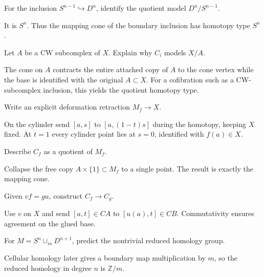 \begin{problem}\label{prob:viii07-09}
For the inclusion \(S^{n-1}\hookrightarrow D^n\), identify the quotient model \(D^n/S^{n-1}\).
\end{problem}
\begin{solution}
It is \(S^n\).  Thus the mapping cone of the boundary inclusion has homotopy type \(S^n\).
\end{solution}

\begin{problem}\label{prob:viii07-10}
Let \(A\) be a CW subcomplex of \(X\).  Explain why \(C_i\) models \(X/A\).
\end{problem}
\begin{solution}
The cone on \(A\) contracts the entire attached copy of \(A\) to the cone vertex while the base is identified with the original \(A\subset X\).  For a cofibration such as a CW-subcomplex inclusion, this yields the quotient homotopy type.
\end{solution}

\begin{problem}\label{prob:viii07-11}
Write an explicit deformation retraction \(M_f\to X\).
\end{problem}
\begin{solution}
On the cylinder send \([a,s]\) to \([a,(1-t)s]\) during the homotopy, keeping \(X\) fixed.  At \(t=1\) every cylinder point lies at \(s=0\), identified with \(f(a)\in X\).
\end{solution}

\begin{problem}\label{prob:viii07-12}
Describe \(C_f\) as a quotient of \(M_f\).
\end{problem}
\begin{solution}
Collapse the free copy \(A\times\{1\}\subset M_f\) to a single point.  The result is exactly the mapping cone.
\end{solution}

\begin{problem}\label{prob:viii07-13}
Given \(vf=gu\), construct \(C_f\to C_g\).
\end{problem}
\begin{solution}
Use \(v\) on \(X\) and send \([a,t]\in CA\) to \([u(a),t]\in CB\).  Commutativity ensures agreement on the glued base.
\end{solution}

\begin{problem}\label{prob:viii07-14}
For \(M=S^n\cup_mD^{n+1}\), predict the nontrivial reduced homology group.
\end{problem}
\begin{solution}
Cellular homology later gives a boundary map multiplication by \(m\), so the reduced homology in degree \(n\) is \(\mathbb Z/m\).
\end{solution}

